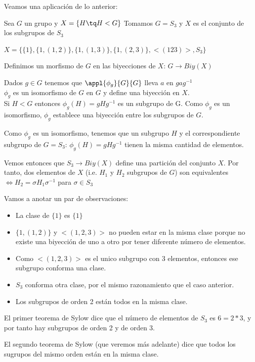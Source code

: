 \documentclass[nochap]{apuntes}
\begin{document}
Veamos una aplicación de lo anterior:

\begin{example}
Sea $G$ un grupo y $X = \{ H\tq H<G\} $
Tomamos $G = S_3$ y $X$ es el conjunto de los subgrupos de $S_3$

$X = \{ \{1 \}, \{1, (1,2) \}, \{1, (1,3) \}, \{1, (2,3) \}, <(123)>, S_3 \}$

Definimos un morfismo de $G$ en las biyecciones de $X$: $G\longrightarrow Biy(X)$

Dados $g\in G$ tenemos que $\appl{\phi_g}{G}{G}$ lleva $a$ en $gag^{-1}$\\
$\phi _g$ es un isomorfismo de $G$ en $G$ y define una biyección en $X$.\\
Si $H<G$ entonces $\phi _g(H) = gHg^{-1}$ es un subgrupo de G. Como $\phi_g$ es un isomorfismo, $\phi _g$ establece una biyección entre los subgrupos de $G$.

Como $\phi _g$ es un isomorfismo, tenemos que un subgrupo $H$ y el correspondiente subgrupo de $G=S_3$: $\phi _g(H) = gHg^{-1}$ tienen la misma cantidad de elementos.

Vemos entonces que $S_3 \longrightarrow Biy(X)$ define una partición del conjunto $X$.
Por tanto, dos elementos de $X$ (i.e. $H_1$ y $H_2$ subgrupos de $G$) son equivalentes $\iff H_2 = \sigma H_1 \sigma^{-1}$ para $\sigma \in S_3$

Vamos a anotar un par de observaciones:\\
\begin{itemize}
\item La clase de $\{ 1\}$ es $\{ 1\}$
\item $\{ 1, (1,2)\}$ y $<(1,2,3)>$ no pueden estar en la misma clase porque no existe una biyección de uno a otro por tener diferente número de elementos.
\item Como $<(1,2,3)>$ es el unico subgrupo con 3 elementos, entonces ese subgrupo conforma una clase.
\item $S_3$ conforma otra clase, por el mismo razonamiento que el caso anterior.
\item Los subgrupos de orden 2 están todos en la misma clase.
\end{itemize}

El primer teorema de Sylow dice que el número de elementos de $S_3$ es $6=2*3$, y por tanto hay subgrupos de orden 2 y de orden 3.

El segundo teorema de Sylow (que veremos más adelante) dice que todos los sugrupos del mismo orden están en la misma clase.
\end{example}
\end{document}
